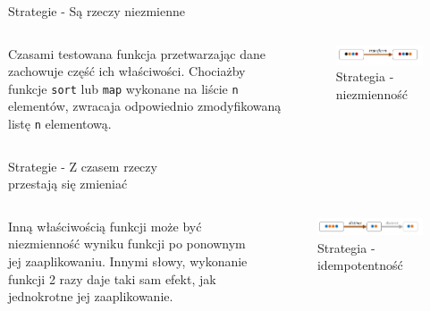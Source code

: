 \begin{frame}{Strategie - Są rzeczy niezmienne}
    \begin{columns}[t]
            Czasami testowana funkcja przetwarzając dane zachowuje część ich właściwości.
            Chociażby funkcje \texttt{sort} lub \texttt{map} wykonane na liście \texttt{n} elementów, zwracaja odpowiednio zmodyfikowaną listę \texttt{n} elementową.
        \centering
        \begin{figure}
            \centering
            \includegraphics[width=1\textwidth]{images/property_invariant.png}
            \caption{Strategia - niezmienność}
            \label{fig:invariant_strategy}
        \end{figure}    
    \end{columns}
\end{frame}


\begin{frame}{Strategie - Z czasem rzeczy\\przestają się zmieniać}
    \begin{columns}[t]
            Inną właściwością funkcji może być niezmienność wyniku funkcji po ponownym jej zaaplikowaniu. 
            Innymi słowy, wykonanie funkcji 2 razy daje taki sam efekt, jak jednokrotne jej zaaplikowanie.
        \centering
        \begin{figure}
            \centering
            \includegraphics[width=1\textwidth]{images/property_idempotence.png}
            \caption{Strategia - idempotentność}
            \label{fig:independance_strategy}
        \end{figure}    
    \end{columns}
\end{frame}



